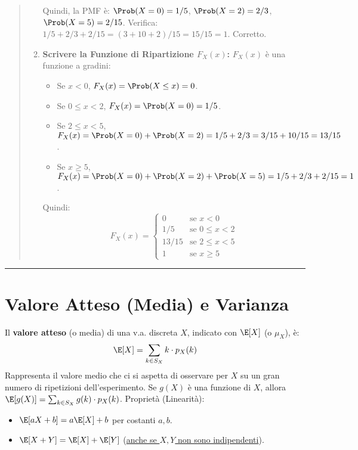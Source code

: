 \begin{quote}
\begin{enumerate}
    Quindi, la PMF è: $\Prob(X=0)=1/5$, $\Prob(X=2)=2/3$, $\Prob(X=5)=2/15$.
    Verifica: $1/5 + 2/3 + 2/15 = (3+10+2)/15 = 15/15=1$. Corretto.
    \item \textbf{Scrivere la Funzione di Ripartizione $F_X(x)$:}
    $F_X(x)$ è una funzione a gradini:
    \begin{itemize}
        \item Se $x < 0$, $F_X(x) = \Prob(X \le x) = 0$.
        \item Se $0 \le x < 2$, $F_X(x) = \Prob(X=0) = 1/5$.
        \item Se $2 \le x < 5$, $F_X(x) = \Prob(X=0) + \Prob(X=2) = 1/5 + 2/3 = 3/15 + 10/15 = 13/15$.
        \item Se $x \ge 5$, $F_X(x) = \Prob(X=0) + \Prob(X=2) + \Prob(X=5) = 1/5 + 2/3 + 2/15 = 1$.
    \end{itemize}
    Quindi:
    \[ F_X(x) = \begin{cases} 0 & \text{se } x < 0 \\ 1/5 & \text{se } 0 \le x < 2 \\ 13/15 & \text{se } 2 \le x < 5 \\ 1 & \text{se } x \ge 5 \end{cases} \]
\end{enumerate}
\end{quote}
\vspace{0.5em}
\hrule
\vspace{1em}


\section{Valore Atteso (Media) e Varianza}
\begin{definition}\label{def:valore-atteso}
Il \textbf{valore atteso} (o media) di una v.a. discreta $X$, indicato con $\E[X]$ (o $\mu_X$), è:
\[ \E[X] = \sum_{k \in S_X} k \cdot p_X(k) \]
Rappresenta il valore medio che ci si aspetta di osservare per $X$ su un gran numero di ripetizioni dell'esperimento.
Se $g(X)$ è una funzione di $X$, allora $\E[g(X)] = \sum_{k \in S_X} g(k) \cdot p_X(k)$.
Proprietà (Linearità):
\begin{itemize}
    \item $\E[aX+b] = a\E[X]+b$ per costanti $a,b$.
    \item $\E[X+Y] = \E[X]+\E[Y]$ (\underline{anche se $X,Y$ non sono indipendenti}).
\end{itemize}
\end{definition}

